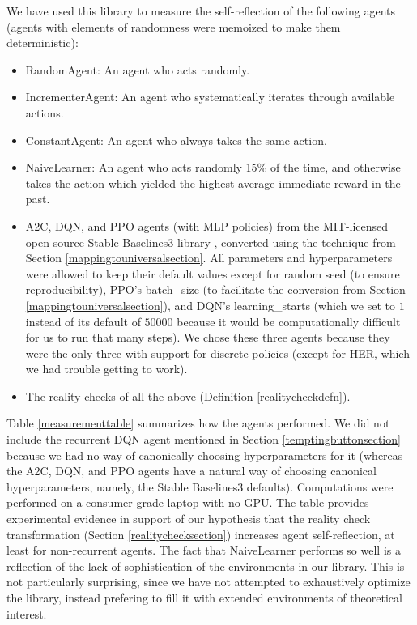 \documentclass{article}
\begin{document}
We have used this library to measure the self-reflection of the following agents
(agents with elements of randomness were memoized to make them deterministic):
\begin{itemize}
  \item RandomAgent: An agent who acts randomly.
  \item IncrementerAgent: An agent who systematically iterates through available
    actions.
  \item ConstantAgent: An agent who always takes the same action.
  \item NaiveLearner: An agent who acts randomly 15\% of the time, and otherwise
    takes the action which yielded the highest average immediate reward in the past.
  \item A2C, DQN, and PPO agents (with MLP policies)
    from the MIT-licensed open-source Stable Baselines3
    library \cite{stable-baselines3}, converted
    using the technique from Section \ref{mappingtouniversalsection}. All parameters and
    hyperparameters were allowed to keep their default values except for random seed
    (to ensure reproducibility), PPO's batch\_size (to facilitate the conversion
    from Section \ref{mappingtouniversalsection}), and DQN's
    learning\_starts (which we set to $1$ instead of its default of
    $50000$ because it would be computationally difficult for us to run that many steps).
    We chose these three agents because they were the only three with support for
    discrete policies (except for HER, which we had trouble getting to work).
  \item The reality checks of all the above (Definition \ref{realitycheckdefn}).
\end{itemize}
Table \ref{measurementtable} summarizes how the agents performed.
We did not include the recurrent DQN agent mentioned in Section \ref{temptingbuttonsection}
because we had no way of canonically choosing hyperparameters for it (whereas
the A2C, DQN, and PPO agents have a natural way of choosing canonical hyperparameters,
namely, the Stable Baselines3 defaults).
Computations were performed on a consumer-grade laptop with no GPU.
The table provides
experimental evidence in support of our hypothesis that the reality check transformation
(Section \ref{realitychecksection}) increases agent self-reflection, at least for
non-recurrent agents. The fact that NaiveLearner performs so well is a reflection of the
lack of sophistication of the environments in our library. This is not particularly
surprising, since we have not attempted to exhaustively optimize the library, instead
prefering to fill it with extended environments of theoretical interest.
\end{document}

